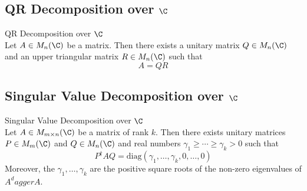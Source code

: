 \documentclass[a4paper]{article}
\begin{document}
\subsection{QR Decomposition over $\C$}
\begin{thm}{QR Decomposition over $\C$}{}\\
Let $A\in M_n(\C)$ be a matrix. Then there exists a unitary matrix $Q\in M_n(\C)$ and an upper triangular matrix $R\in M_n(\C)$ such that $$A=QR$$
\end{thm}

\subsection{Singular Value Decomposition over $\C$}
\begin{thm}{Singular Value Decomposition over $\C$}{}\\
Let $A\in M_{m\times n}(\C)$ be a matrix of rank $k$. Then there exists unitary matrices $P\in M_m(\C)$ and $Q\in M_n(\C)$ and real numbers $\gamma_1\geq\cdots\geq\gamma_k>0$ such that $$P^\dagger AQ=\text{diag}(\gamma_1,\dots,\gamma_k,0,\dots,0)$$ Moreover, the $\gamma_1,\dots,\gamma_k$ are the positive square roots of the non-zero eigenvalues of $A^dagger A$. 
\end{thm}
\end{document}

